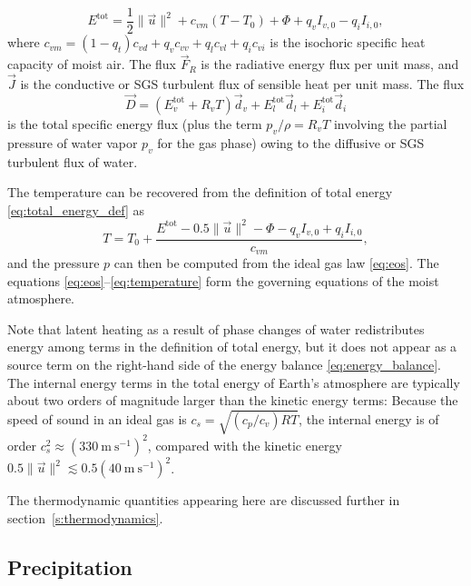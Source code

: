 \documentclass{article}
\begin{document}
\begin{equation}
     E^{\mathrm{tot}} = \frac{1}{2} \| \vec{u} \|^2 + c_{vm} (T - T_0) + \Phi + q_v I_{v,0} - q_i I_{i,0},
     \label{eq:total_energy_def}
\end{equation}
where $c_{vm}= (1-q_t) c_{vd} + q_v c_{vv} + q_l c_{vl} + q_i c_{vi}$ is the isochoric specific heat capacity of moist air. The flux $\vec{F}_R$ is the radiative energy flux per unit mass, and $\vec{J}$ is the conductive or SGS turbulent flux of sensible heat per unit mass. The flux 
\begin{equation}
\vec{D} = (E_v^{\mathrm{tot}} + R_v T) \vec{d}_v + E_l^{\mathrm{tot}} \vec{d}_l +  E_i^{\mathrm{tot}} \vec{d}_i
\end{equation}
is the total specific energy flux (plus the term $p_v/\rho = R_v T$ involving the partial pressure of water vapor $p_v$ for the gas phase) owing to the diffusive or SGS turbulent flux of water.  

The temperature can be recovered from the definition of total energy \eqref{eq:total_energy_def} as 
\begin{equation}
    T = T_0 + \frac{E^{\mathrm{tot}} - 0.5 \| \vec{u} \|^2 - \Phi - q_v I_{v,0} + q_i I_{i,0}}{c_{vm}},
    \label{eq:temperature}
\end{equation}
and the pressure $p$ can then be computed from the ideal gas law \eqref{eq:eos}. The equations \eqref{eq:eos}--\eqref{eq:temperature} form the governing equations of the moist atmosphere.

Note that latent heating as a result of phase changes of water redistributes energy among terms in the definition of total energy, but it does not appear as a source term on the right-hand side of the energy balance \eqref{eq:energy_balance}. The internal energy terms in the total energy of Earth's atmosphere are typically about two orders of magnitude larger than the kinetic energy terms: Because the speed of sound in an ideal gas is $c_s = \sqrt{(c_p/c_v) R T}$, the internal energy is of order $c_s^2 \approx (330~\mathrm{m~s^{-1}})^2$, compared with the kinetic energy $0.5 \|\vec{u}\|^2 \lesssim 0.5(40~\mathrm{m~s^{-1}})^2$.

The thermodynamic quantities appearing here are discussed further in section~\ref{s:thermodynamics}.

\subsection{Precipitation}
\end{document}
